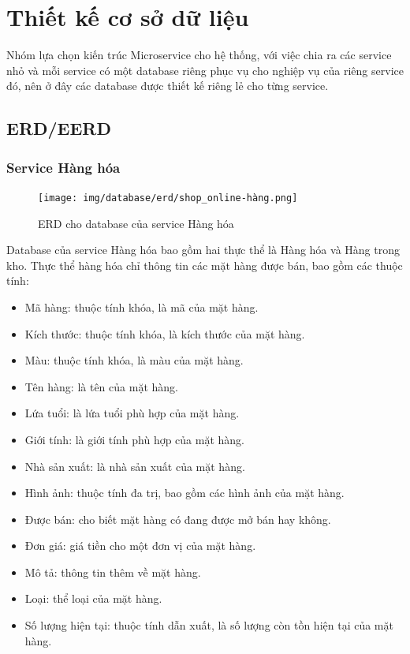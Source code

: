 \section{Thiết kế cơ sở dữ liệu}
\par Nhóm lựa chọn kiến trúc Microservice cho hệ thống, với việc chia ra các service nhỏ và mỗi service có một database riêng phục vụ cho nghiệp vụ của riêng service đó, nên ở đây các database được thiết kế riêng lẻ cho từng service.

\subsection{ERD/EERD}
\subsubsection{Service Hàng hóa}
\begin{figure}[!htp]
    \begin{center}
        \texttt{[image: img/database/erd/shop\_online-hàng.png]}
        \newline
        \caption{ERD cho database của service Hàng hóa}
    \end{center}
\end{figure}

\par Database của service Hàng hóa bao gồm hai thực thể là Hàng hóa và Hàng trong kho. Thực thể hàng hóa chỉ thông tin các mặt hàng được bán, bao gồm các thuộc tính:
\begin{itemize}
    \item Mã hàng: thuộc tính khóa, là mã của mặt hàng.
    \item Kích thước: thuộc tính khóa, là kích thước của mặt hàng.
    \item Màu: thuộc tính khóa, là màu của mặt hàng.
    \item Tên hàng: là tên của mặt hàng.
    \item Lứa tuổi: là lứa tuổi phù hợp của mặt hàng.
    \item Giới tính: là giới tính phù hợp của mặt hàng.
    \item Nhà sản xuất: là nhà sản xuất của mặt hàng.
    \item Hình ảnh: thuộc tính đa trị, bao gồm các hình ảnh của mặt hàng.
    \item Được bán: cho biết mặt hàng có đang được mở bán hay không.
    \item Đơn giá: giá tiền cho một đơn vị của mặt hàng.
    \item Mô tả: thông tin thêm về mặt hàng.
    \item Loại: thể loại của mặt hàng.
    \item Số lượng hiện tại: thuộc tính dẫn xuất, là số lượng còn tồn hiện tại của mặt hàng.
\end{itemize}

